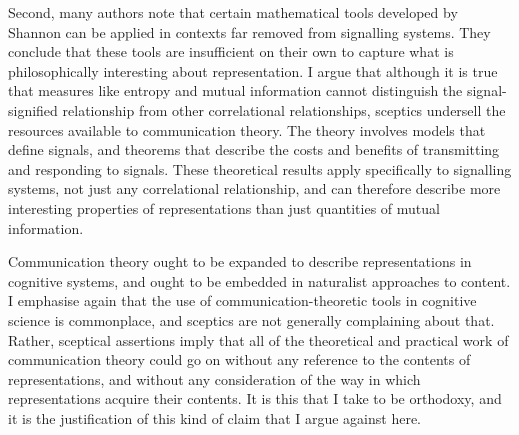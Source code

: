 Second, many authors note that certain mathematical tools developed by Shannon can be applied in contexts far removed from signalling systems.
They conclude that these tools are insufficient on their own to capture what is philosophically interesting about representation.
I argue that although it is true that measures like entropy and mutual information cannot distinguish the signal-signified relationship from other correlational relationships, sceptics undersell the resources available to communication theory.
The theory involves models that define signals, and theorems that describe the costs and benefits of transmitting and responding to signals.
These theoretical results apply specifically to signalling systems, not just any correlational relationship, and can therefore describe more interesting properties of representations than just quantities of mutual information.

Communication theory ought to be expanded to describe representations in cognitive systems, and ought to be embedded in naturalist approaches to content.
I emphasise again that the use of communication-theoretic tools in cognitive science is commonplace, and sceptics are not generally complaining about that.
Rather, sceptical assertions imply that all of the theoretical and practical work of communication theory could go on without any reference to the contents of representations, and without any consideration of the way in which representations acquire their contents.
It is this that I take to be orthodoxy, and it is the justification of this kind of claim that I argue against here.

